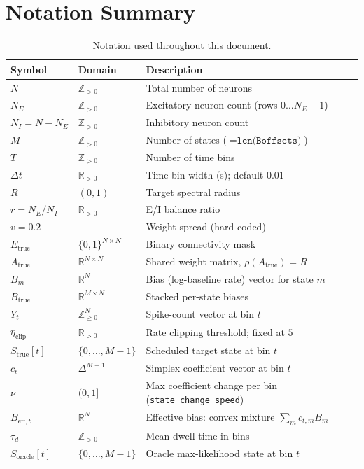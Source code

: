 \documentclass[11pt]{article}
\begin{document}
\section{Notation Summary}
\label{sec:notation}

\begin{table}[h]
\centering
\renewcommand{\arraystretch}{1.2}
\begin{tabular}{lll}
\toprule
Symbol & Domain & Description \\
\midrule
$N$ & $\mathbb{Z}_{>0}$ & Total number of neurons \\
$N_E$ & $\mathbb{Z}_{>0}$ & Excitatory neuron count (rows $0\dots N_E-1$) \\
$N_I = N-N_E$ & $\mathbb{Z}_{>0}$ & Inhibitory neuron count \\
$M$ & $\mathbb{Z}_{>0}$ &
  Number of states ($= \texttt{len(Boffsets)}$) \\
$T$ & $\mathbb{Z}_{>0}$ & Number of time bins \\
$\Delta t$ & $\mathbb{R}_{>0}$ & Time-bin width (s); default $0.01$ \\
$R$ & $(0,1)$ & Target spectral radius \\
$r = N_E/N_I$ & $\mathbb{R}_{>0}$ & E/I balance ratio \\
$v = 0.2$ & --- & Weight spread (hard-coded) \\
$E_{\text{true}}$ & $\{0,1\}^{N\times N}$ & Binary connectivity mask \\
$A_{\text{true}}$ & $\mathbb{R}^{N\times N}$ &
  Shared weight matrix, $\rho(A_{\text{true}}) = R$ \\
$B_m$ & $\mathbb{R}^N$ & Bias (log-baseline rate) vector for state $m$ \\
$B_{\text{true}}$ & $\mathbb{R}^{M\times N}$ & Stacked per-state biases \\
$Y_t$ & $\mathbb{Z}_{\geq 0}^N$ & Spike-count vector at bin $t$ \\
$\eta_{\mathrm{clip}}$ & $\mathbb{R}_{>0}$ &
  Rate clipping threshold; fixed at $5$ \\
\midrule
$S_{\text{true}}[t]$ & $\{0,\dots,M-1\}$ &
  Scheduled target state at bin $t$ \\
$c_t$ & $\Delta^{M-1}$ &
  Simplex coefficient vector at bin $t$ \\
$\nu$ & $(0,1]$ &
  Max coefficient change per bin (\texttt{state\_change\_speed}) \\
$B_{\mathrm{eff},t}$ & $\mathbb{R}^N$ &
  Effective bias: convex mixture $\sum_m c_{t,m} B_m$ \\
$\tau_d$ & $\mathbb{Z}_{>0}$ &
  Mean dwell time in bins \\
$S_{\text{oracle}}[t]$ & $\{0,\dots,M-1\}$ &
  Oracle max-likelihood state at bin $t$ \\
\bottomrule
\end{tabular}
\caption{Notation used throughout this document.}
\label{tab:notation}
\end{table}
\end{document}
